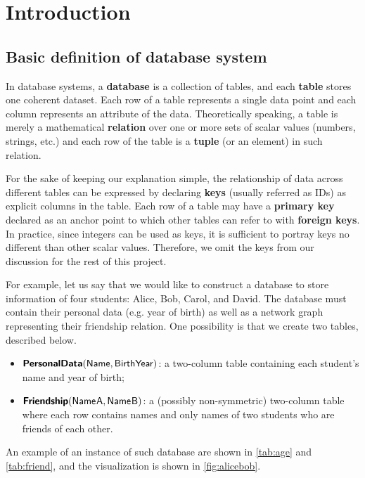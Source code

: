\section{Introduction}


\subsection{Basic definition of database system}

In database systems, a \textbf{database} is a collection of tables, and each \textbf{table} stores one coherent dataset. Each row of a table represents a single data point and each column represents an attribute of the data. Theoretically speaking, a table is merely a mathematical \textbf{relation} over one or more sets of scalar values (numbers, strings, etc.) and each row of the table is a \textbf{tuple} (or an element) in such relation.

For the sake of keeping our explanation simple, the relationship of data across different tables can be expressed by declaring \textbf{keys} (usually referred as IDs) as explicit columns in the table. Each row of a table may have a \textbf{primary key} declared as an anchor point to which other tables can refer to with \textbf{foreign keys}. In practice, since integers can be used as keys, it is sufficient to portray keys no different than other scalar values. Therefore, we omit the keys from our discussion for the rest of this project.

\smallskip
{}
For example, let us say that we would like to construct a database to store information of four students: Alice, Bob, Carol, and David. The database must contain their personal data (e.g. year of birth) as well as a network graph representing their friendship relation. One possibility is that we create two tables, described below.

\newrobustcmd{}
\newrobustcmd{}
\newrobustcmd{}
\newrobustcmd{}

\begin{itemize}[topsep=0.5pc,itemsep=0.25pc]
    \item  $\personaldata$: a two-column table containing each student's name and year of birth;
    \item  $\friendship$: a (possibly non-symmetric) two-column table where each row contains names and only names of two students who are friends of each other.
\end{itemize}
An example of an instance of such database are shown in \autoref{tab:age} and \autoref{tab:friend}, and the visualization is shown in \autoref{fig:alicebob}.

